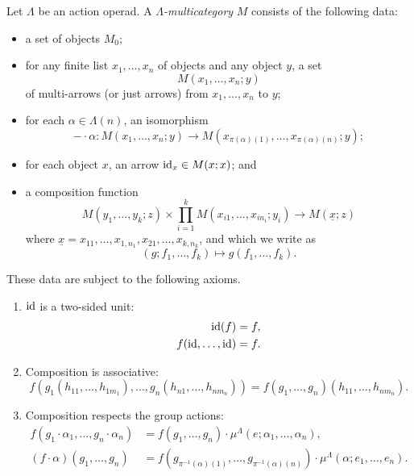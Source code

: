 \begin{Defi}\label{lambda_multicat}
Let $\Lambda$ be an action operad. A \emph{$\Lambda$-multicategory} $M$ consists of the following data:
\begin{itemize}
  \item a set of objects $M_{0}$;
  \item for any finite list $x_{1}, \ldots, x_{n}$ of objects and any object $y$, a set
    \[
      M(x_{1}, \ldots, x_{n}; y)
    \]
  of multi-arrows (or just arrows) from $x_{1}, \ldots, x_{n}$ to $y$;
  \item for each $\alpha \in \Lambda(n)$, an isomorphism
    \[
      -\cdot \alpha \colon M(x_{1}, \ldots, x_{n}; y) \rightarrow M\left(x_{\pi(\alpha)(1)}, \ldots, x_{\pi(\alpha)(n)}; y\right);
    \]
  \item for each object $x$, an arrow $\textrm{id}_{x} \in M(x;x)$; and
  \item a composition function
    \[
      M(y_1,\ldots,y_k;z) \times \prod_{i=1}^k M(x_{i1},\ldots,x_{in_i};y_i) \rightarrow M(\underline{x};z)
    \]
  where $\underline{x} = x_{11}, \ldots, x_{1,n_{1}}, x_{21}, \ldots, x_{k,n_{k}}$, and which we write as
    \[
      (g; f_{1}, \ldots, f_{k}) \mapsto g(f_{1}, \ldots, f_{k}).
    \]
\end{itemize}
These data are subject to the following axioms.
\begin{enumerate}
\item $\textrm{id}$ is a two-sided unit:
  \begin{align*}
    \textrm{id}(f) &= f, \\
    f(\textrm{id},\ldots,\textrm{id}) &= f.
  \end{align*}
\item Composition is associative:
  \[
    f\left( g_{1}(h_{11}, \ldots, h_{1m_{1}}), \ldots, g_{n}(h_{n1}, \ldots, h_{nm_{n}}) \right) = f(g_{1}, \ldots, g_{n})(h_{11}, \ldots, h_{nm_{n}}).
  \]
\item Composition respects the group actions:
  \begin{align*}
    f(g_1 \cdot \alpha_1,\ldots, g_n \cdot \alpha_n) &= f(g_1,\ldots,g_n) \cdot \mu^{\Lambda}(e;\alpha_1,\ldots,\alpha_n), \\
    (f \cdot \alpha)(g_1,\ldots,g_n) &= f\left(g_{\pi^{-1}(\alpha)(1)},\ldots,g_{\pi^{-1}(\alpha)(n)}\right) \cdot \mu^{\Lambda}(\alpha;e_1,\ldots,e_n).
  \end{align*}
\end{enumerate}
\end{Defi}


